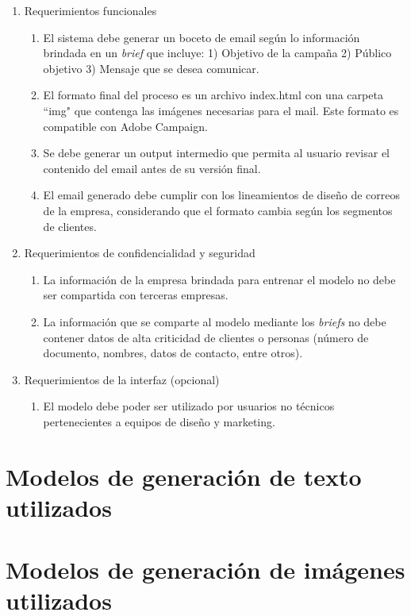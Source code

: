 \begin{enumerate}
	\item Requerimientos funcionales
		\begin{enumerate}
			\item El sistema debe generar un boceto de email según lo información brindada en un \textit{brief} que incluye: 1) Objetivo de la campaña 2) Público objetivo 3) Mensaje que se desea comunicar.
			\item El formato final del proceso es un archivo index.html con una carpeta ``img"  que contenga las imágenes necesarias para el mail. Este formato es compatible con Adobe Campaign.
			\item Se debe generar un output intermedio que permita al usuario revisar el contenido del email antes de su versión final.
			\item El email generado debe cumplir con los lineamientos de diseño de correos de la empresa, considerando que el formato cambia según los segmentos de clientes.
		\end{enumerate}
	\item Requerimientos de confidencialidad y seguridad
		\begin{enumerate}
			\item La información de la empresa brindada para entrenar el modelo no debe ser compartida con terceras empresas.
			\item La información que se comparte al modelo mediante los \textit{briefs} no debe contener datos de alta criticidad de clientes o personas (número de documento, nombres, datos de contacto, entre otros).
		\end{enumerate}
	\item Requerimientos de la interfaz (opcional)
		\begin{enumerate}
			\item El modelo debe poder ser utilizado por usuarios no técnicos pertenecientes a equipos de diseño y marketing.
		\end{enumerate}
\end{enumerate}

\section{Modelos de generación de texto utilizados}

\section{Modelos de generación de imágenes utilizados}